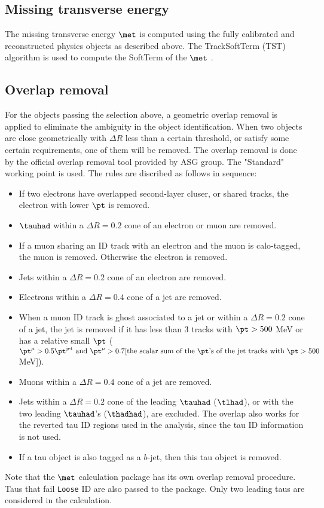 \subsection{Missing transverse energy}
The missing transverse energy $\met$ is computed using the fully calibrated and reconstructed physics objects as described above. The TrackSoftTerm (TST) algorithm is used to compute the SoftTerm of the $\met$ \cite{MET}. 

\subsection{Overlap removal}
For the objects passing the selection above, a geometric overlap removal is applied to eliminate the ambiguity in the object identification.  When two objects are close geometrically with $\Delta R$ less than a certain threshold, or satisfy some certain requirements, one of them will be removed. The overlap removal is done by the official overlap removal tool provided by ASG group. The "Standard" working point is used. The rules are discribed as follows in sequence:

\begin{itemize}
\item If two electrons have overlapped second-layer cluser, or shared tracks, the electron with lower $\pt$ is removed.
\item $\tauhad$ within a $\Delta R=0.2$ cone of an electron or muon are removed.
\item If a muon sharing an ID track with an electron and the muon is calo-tagged, the muon is removed. Otherwise the electron is removed.
\item Jets within a $\Delta R=0.2$ cone of an electron are removed.
\item Electrons within a $\Delta R=0.4$ cone of a jet are removed.
\item When a muon ID track is ghost associated to a jet or within a $\Delta R=0.2$ cone of a jet, the jet is removed if it has less than 3 tracks with $\pt>500$ MeV or has a relative small $\pt$ ($\pt^{\mu}>0.5\pt^{\text{jet}} \text{ and } \pt^{\mu}>0.7[\text{the scalar sum of the } \pt \text{'s of the jet tracks with } \pt>500$ MeV]).
\item Muons within a $\Delta R=0.4$ cone of a jet are removed.
\item Jets within a $\Delta R=0.2$ cone of the leading $\tauhad$ ($\tlhad$), or with the two leading $\tauhad$'s ($\thadhad$), are excluded. The overlap also works for the reverted tau ID regions used in the analysis, since the tau ID information is not used.
\item If a tau object is also tagged as a $b$-jet, then this tau object is removed.
\end{itemize}

Note that the $\met$ calculation package has its own overlap removal procedure. Taus that fail \texttt{Loose} ID are also passed to the package. Only two leading taus are considered in the calculation.
